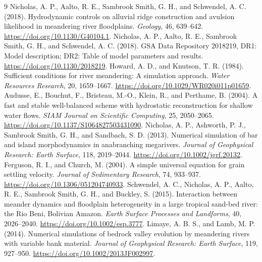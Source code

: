 \documentclass[11pt]{article}
\begin{document}
\begin{thebibliography}{9}
 Nicholas, A. P., Aalto, R. E., Sambrook Smith,
G. H., and Schwendel, A. C. (2018). Hydrodynamic controls on alluvial ridge
construction and avulsion likelihood in meandering river floodplains.
\emph{Geology}, 46, 639--642. \url{https://doi.org/10.1130/G40104.1}.
 Nicholas, A. P., Aalto, R. E., Sambrook Smith,
G. H., and Schwendel, A. C. (2018). GSA Data Repository 2018219,
DR1: Model description; DR2: Table of model parameters and results.
\url{https://doi.org/10.1130/2018219}.
 Howard, A. D., and Knutson, T. R. (1984).
Sufficient conditions for river meandering: A simulation approach.
\emph{Water Resources Research}, 20, 1659--1667.
\url{https://doi.org/10.1029/WR020i011p01659}.
 Audusse, E., Bouchut, F., Bristeau, M.-O.,
Klein, R., and Perthame, B. (2004). A fast and stable well-balanced scheme
with hydrostatic reconstruction for shallow water flows.
\emph{SIAM Journal on Scientific Computing}, 25, 2050--2065.
\url{https://doi.org/10.1137/S1064827503431090}.
 Nicholas, A. P., Ashworth, P. J., Sambrook Smith,
G. H., and Sandbach, S. D. (2013). Numerical simulation of bar and island
morphodynamics in anabranching megarivers.
\emph{Journal of Geophysical Research: Earth Surface}, 118, 2019--2044.
\url{https://doi.org/10.1002/jgrf.20132}.
 Ferguson, R. I., and Church, M. (2004).
A simple universal equation for grain settling velocity.
\emph{Journal of Sedimentary Research}, 74, 933--937.
\url{https://doi.org/10.1306/051204740933}.
 Schwendel, A. C., Nicholas, A. P., Aalto, R. E.,
Sambrook Smith, G. H., and Buckley, S. (2015). Interaction between meander
dynamics and floodplain heterogeneity in a large tropical sand-bed river:
the Rio Beni, Bolivian Amazon.
\emph{Earth Surface Processes and Landforms}, 40, 2026--2040.
\url{https://doi.org/10.1002/esp.3777}.
 Limaye, A. B. S., and Lamb, M. P. (2014).
Numerical simulations of bedrock valley evolution by meandering rivers
with variable bank material.
\emph{Journal of Geophysical Research: Earth Surface}, 119, 927--950.
\url{https://doi.org/10.1002/2013JF002997}.
\end{thebibliography}
\end{document}

